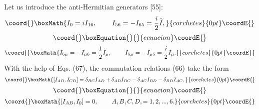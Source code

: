 \documentclass[a4paper,12pt]{article}
\begin{document}
Let us introduce the anti-Hermitian generators [55]:
\[\coord{}\boxMath{
I_0=iI_{16} ,\hspace{0.3in}I_{56}=-I_{65}=\frac i2\widetilde{I} ,
}{corchetes}{0pt}\coordE{}\]
\vspace{-8mm}
\begin{equation}\coord{}\boxEquation{  \label{67}
}{  }{ecuacion}\coordE{}\end{equation}
\vspace{-8mm}
\[\coord{}\boxMath{
I_{6\mu }=-I_{\mu 6}=\frac 12\widetilde{I}_\mu
,\hspace{0.3in}I_{5\mu }=-I_{\mu 5}=\frac i2I_\mu .
}{corchetes}{0pt}\coordE{}\]
With the help of Eqs. (67), the commutation relations (66) take the form
\[\coord{}\boxMath{
\left[ I_{AB},I_{CD}\right] =\delta _{BC}I_{AD}+\delta
_{AD}I_{BC}-\delta _{AC}I_{BD}-\delta _{BD}I_{AC} ,
}{corchetes}{0pt}\coordE{}\]
\vspace{-8mm}
\begin{equation}\coord{}\boxEquation{  \label{68}
}{  }{ecuacion}\coordE{}\end{equation}
\vspace{-8mm}
\[\coord{}\boxMath{
\left[ I_{AB},I_0\right] =0 ,\hspace{0.3in}A,B,C,D,=1, 2,...,6 .
}{corchetes}{0pt}\coordE{}\]
\end{document}
